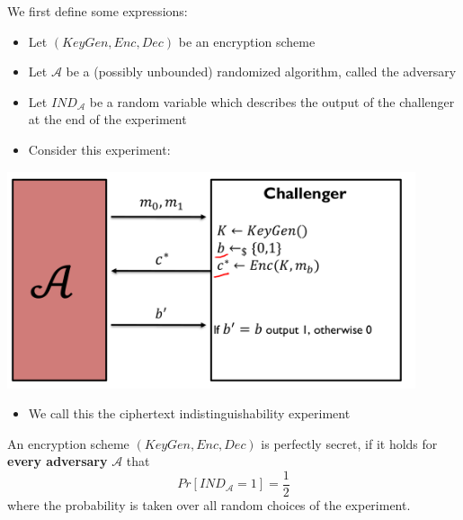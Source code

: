 		\begin{definition}\label{Def.PerfectSecrecy3}
    		We first define some expressions:
        		\begin{itemize}
        			\item Let $(KeyGen,Enc,Dec)$ be an encryption scheme
            		\item Let $\mathcal{A}$ be a (possibly unbounded) randomized algorithm, called the adversary
            		\item Let $IND_{\mathcal{A}}$ be a random variable which describes the output of the challenger at the end of the experiment
            		\item Consider this experiment:
        		\end{itemize}
        		\begin{center}
					\includegraphics[width=120mm]{Graphics/Perfect Secrecy/def3.png}\newline
				\end{center}
				\begin{itemize}
					\item We call this the ciphertext indistinguishability experiment
				\end{itemize}
    
    	An encryption scheme $(KeyGen,Enc,Dec)$ is perfectly secret, if it holds for \textbf{every adversary} $\mathcal{A}$ that
    	$$Pr[IND_{\mathcal{A}} = 1] = \frac{1}{2}$$
   		where the probability is taken over all random choices of the experiment.\newline
    	\end{definition}
    	
